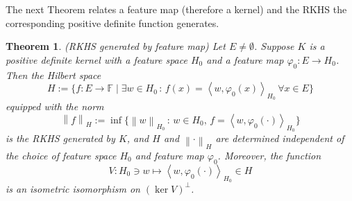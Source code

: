 \documentclass[a4paper,12pt]{article}
\newtheorem{thm}{Theorem}[section]
\theoremstyle{remark}
\theoremstyle{definition}
\theoremstyle{definition}
\theoremstyle{definition}
\newcommand{\ip}[2]{\left<#1, #2 \right>}
\newcommand{\norm}[1]{\left\| #1 \right\|}
\begin{document}
The next Theorem relates a feature map (therefore a kernel) and the RKHS the corresponding positive definite function generates.
\begin{thm} (RKHS generated by feature map)
	Let \( E \neq \emptyset \). Suppose \( K \) is a positive definite kernel with a feature space \( H_0 \) and a feature map \( \varphi_0 :E \to H_0 \). Then the Hilbert space
	\begin{equation*}
		H:= \{f:E \to \mathbb{F} \mid \exists w \in H_0 \,:\, f(x)=\ip{w}{\varphi_0(x)}_{H_0}\, \forall x \in E \}
	\end{equation*}
	equipped with the norm
	\begin{equation*}
		\norm{f}_H := \inf \{\norm{w}_{H_0} \,:\, w \in H_0,\, f = \ip{w}{\varphi_0(\cdot )}_{H_0}\}
	\end{equation*}
	is the RKHS generated by \( K \), and \( H \) and \( \norm{\cdot }_H \) are determined independent of the choice of feature space \( H_0 \) and feature map \( \varphi_0 \). Moreover, the function
	\begin{equation*}
		V : H_0 \ni w \mapsto \ip{w}{\varphi_0(\cdot )}_{H_0} \in H
	\end{equation*}
	is an isometric isomorphism on \( (\ker V)^{\perp} \).
\end{thm}
\end{document}
